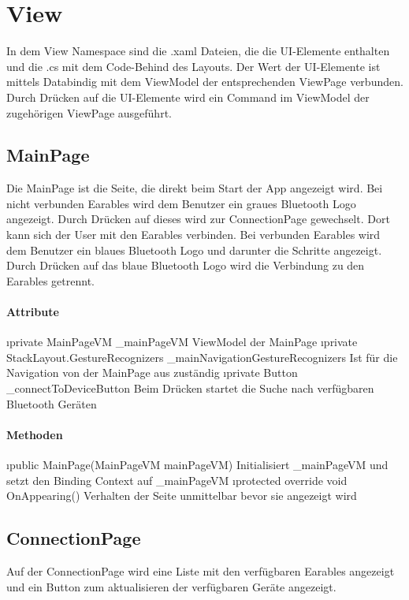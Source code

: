 \documentclass[../entwurf.tex]{subfiles}
\begin{document}
\section{View}
In dem View Namespace sind die .xaml Dateien, die die UI-Elemente enthalten und die .cs mit dem Code-Behind des Layouts. Der Wert der UI-Elemente ist mittels Databindig mit dem ViewModel der entsprechenden ViewPage verbunden. Durch Drücken auf die UI-Elemente wird ein Command im ViewModel der zugehörigen ViewPage ausgeführt. 
\subsection{MainPage}
Die MainPage ist die Seite, die direkt beim Start der App angezeigt wird. Bei nicht verbunden Earables wird dem Benutzer ein graues Bluetooth Logo angezeigt. Durch Drücken auf dieses wird zur ConnectionPage gewechselt. Dort kann sich der User mit den Earables verbinden. Bei verbunden Earables wird dem Benutzer ein blaues Bluetooth Logo und darunter die Schritte angezeigt. Durch Drücken auf das blaue Bluetooth Logo wird die Verbindung zu den Earables getrennt. 
\paragraph{Attribute}

\begin{itemize}
	\i{private MainPageVM \_mainPageVM} ViewModel der MainPage
	\i{private StackLayout.GestureRecognizers \_mainNavigationGestureRecognizers} Ist für die Navigation von der MainPage aus zuständig
	\i{private Button \_connectToDeviceButton} Beim Drücken startet die Suche nach verfügbaren Bluetooth Geräten
\end{itemize}
\paragraph{Methoden}
\begin{itemize}
	\i{public MainPage(MainPageVM mainPageVM)} Initialisiert \_mainPageVM und setzt den Binding Context 			auf \_mainPageVM
	\i{protected override void OnAppearing()} Verhalten der Seite unmittelbar bevor sie angezeigt wird
\end{itemize}

\subsection{ConnectionPage}
Auf der ConnectionPage wird eine Liste mit den verfügbaren Earables angezeigt und ein Button zum aktualisieren der verfügbaren Geräte angezeigt. 
\end{document}
